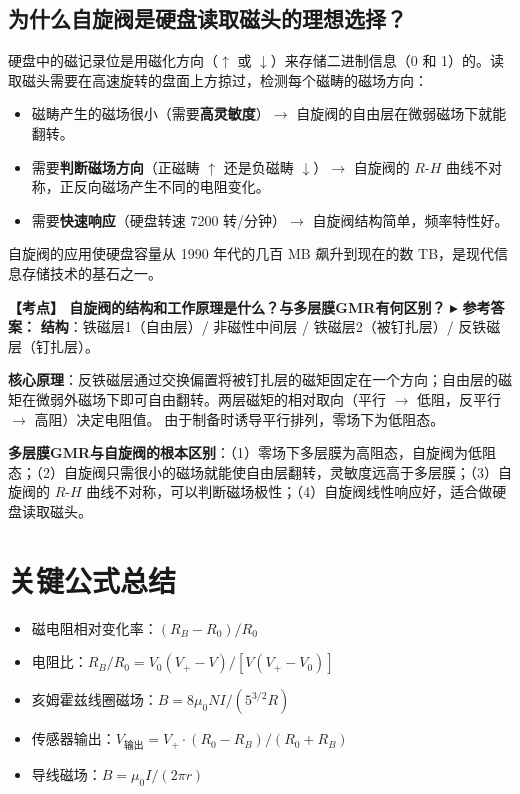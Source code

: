 \documentclass[12pt,a4paper]{article}
\newcommand{\exam}[1]{\textbf{\color{blue!70!black}【考点】#1}}
\newcommand{\answer}[1]{\vspace{2pt}\noindent\textbf{\color{teal!80!black}▸ 参考答案：}#1\vspace{4pt}}
\newcommand{\qa}[2]{\exam{#1}\answer{#2}}
\begin{document}
\subsection{为什么自旋阀是硬盘读取磁头的理想选择？}
硬盘中的磁记录位是用磁化方向（$\uparrow$ 或 $\downarrow$）来存储二进制信息（0 和 1）的。读取磁头需要在高速旋转的盘面上方掠过，检测每个磁畴的磁场方向：

\begin{itemize}
    \item 磁畴产生的磁场很小（需要\textbf{高灵敏度}）$\to$ 自旋阀的自由层在微弱磁场下就能翻转。
    \item 需要\textbf{判断磁场方向}（正磁畴 $\uparrow$ 还是负磁畴 $\downarrow$）$\to$ 自旋阀的 $R$-$H$ 曲线不对称，正反向磁场产生不同的电阻变化。
    \item 需要\textbf{快速响应}（硬盘转速 7200 转/分钟）$\to$ 自旋阀结构简单，频率特性好。
\end{itemize}

自旋阀的应用使硬盘容量从 1990 年代的几百 MB 飙升到现在的数 TB，是现代信息存储技术的基石之一。

\qa{
    自旋阀的结构和工作原理是什么？与多层膜GMR有何区别？
}{
    \textbf{结构}：铁磁层1（自由层）/ 非磁性中间层 / 铁磁层2（被钉扎层）/ 反铁磁层（钉扎层）。

    \textbf{核心原理}：反铁磁层通过交换偏置将被钉扎层的磁矩固定在一个方向；自由层的磁矩在微弱外磁场下即可自由翻转。两层磁矩的相对取向（平行 $\to$ 低阻，反平行 $\to$ 高阻）决定电阻值。$\;$由于制备时诱导平行排列，零场下为低阻态。

    \textbf{多层膜GMR与自旋阀的根本区别}：（1）零场下多层膜为高阻态，自旋阀为低阻态；（2）自旋阀只需很小的磁场就能使自由层翻转，灵敏度远高于多层膜；（3）自旋阀的 $R$-$H$ 曲线不对称，可以判断磁场极性；（4）自旋阀线性响应好，适合做硬盘读取磁头。
}

\section{关键公式总结}
\begin{itemize}
    \item 磁电阻相对变化率：\((R_B - R_0)/R_0\)
    \item 电阻比：\(R_B/R_0 = V_0(V_+ - V) / [V(V_+ - V_0)]\)
    \item 亥姆霍兹线圈磁场：\(B = 8\mu_0 NI / (5^{3/2}R)\)
    \item 传感器输出：\(V_{\text{输出}} = V_+ \cdot (R_0 - R_B)/(R_0 + R_B)\)
    \item 导线磁场：\(B = \mu_0 I / (2\pi r)\)
\end{itemize}
\end{document}
